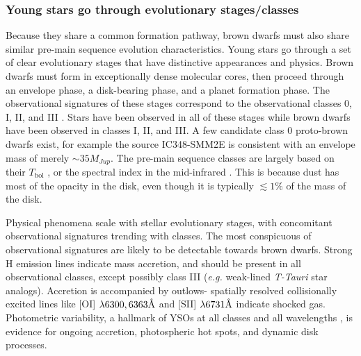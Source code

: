 \documentclass[12pt,preprint]{aastex}
\newcommand{\angstrom}{\mbox{\normalfont\AA}}
\begin{document}
\subsubsection{Young stars go through evolutionary stages/classes}
Because they share a common formation pathway, brown dwarfs must also share similar pre-main sequence evolution characteristics.  Young stars go through a set of clear evolutionary stages that have distinctive appearances and physics.  Brown dwarfs must form in exceptionally dense molecular cores, then proceed through an envelope phase, a disk-bearing phase, and a planet formation phase.  The observational signatures of these stages correspond to the observational classes 0, I, II, and III \citep{1987ApJ...312..788A}.  Stars have been observed in all of these stages \citep{2014prpl.conf..195D} while brown dwarfs have been observed in classes I, II, and III.  A few candidate class 0 proto-brown dwarfs exist\citep{2012Sci...337...69A, 2014A&A...564A..32P, 2014MNRAS.444..833P}, for example the source IC348-SMM2E is consistent with an envelope mass of merely $\sim35 M_{Jup}$.  The pre-main sequence classes are largely based on their $T_{\mathrm{bol}}$ \citep{1993ApJ...413L..47M}, or the spectral index in the mid-infrared \citep{1984ApJ...287..610L}.  This is because dust has most of the opacity in the disk, even though it is typically $\lesssim1\%$ of the mass of the disk.  

Physical phenomena scale with stellar evolutionary stages, with concomitant observational signatures trending with classes.  The most conspicuous of observational signatures are likely to be detectable towards brown dwarfs.  Strong H emission lines indicate mass accretion, and should be present in all observational classes, except possibly class III (\emph{e.g.} weak-lined \emph{T-Tauri} star analogs).  Accretion is accompanied by outlows- spatially resolved collisionally excited lines like [OI] $\lambda 6300, 6363 \angstrom$ and [SII] $\lambda 6731 \angstrom$ \citep{2005Natur.435..652W} indicate shocked gas.  Photometric variability, a hallmark of YSOs at all classes and all wavelengths \citep{2014AJ....148...92R, 2014AJ....147...82C}, is evidence for ongoing accretion, photospheric hot spots, and dynamic disk processes.
\end{document}
